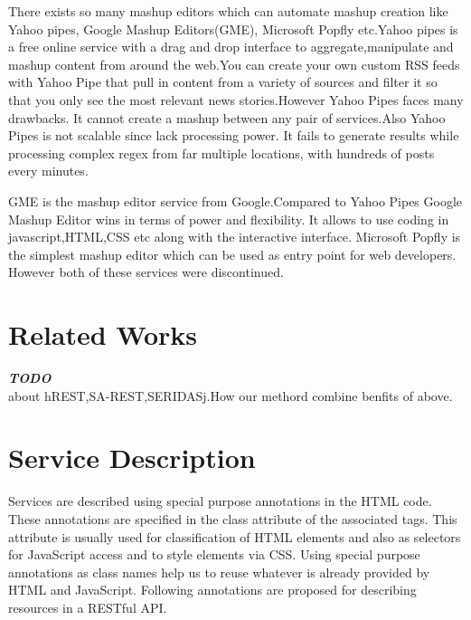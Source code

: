 \documentclass[journal]{IEEEtran}
\begin{document}
There exists so many mashup editors which can automate mashup creation like Yahoo pipes\cite{pip}, Google Mashup Editors(GME), Microsoft Popfly etc.Yahoo pipes is a free online service with a drag and drop interface to aggregate,manipulate and mashup content from around the web.You can create your own custom RSS feeds with Yahoo Pipe that pull in content from a variety of sources and filter it so that you only see the most relevant news stories.However Yahoo Pipes faces many drawbacks. It cannot create a mashup between any pair of services.Also Yahoo Pipes is not scalable since lack processing power. It fails to generate results while processing complex regex from far multiple locations, with hundreds of posts every minutes.

GME is the  mashup editor service from Google.Compared to Yahoo Pipes Google Mashup Editor wins in terms of power and flexibility. It allows to use coding in javascript,HTML,CSS etc along with the interactive interface. Microsoft Popfly is the simplest mashup editor which can be used as entry point for web developers. However both of these services were discontinued. 

\section{Related Works}
\vspace{150pt}
\textit{\textbf{TODO}}\\
about hREST,SA-REST,SERIDASj.How our methord combine benfits of above.
\vspace{150pt}

\section{Service Description}
\label{sec:ServiceDescription}
Services are described using special purpose annotations in the HTML code. These annotations are specified in the class attribute of the associated tags. This attribute is usually used for classification of HTML elements and also as selectors for JavaScript access and to style elements via CSS. Using special purpose annotations as class names help us to reuse whatever is already provided by HTML and JavaScript. Following annotations are proposed for describing resources in a RESTful API.
\end{document}
